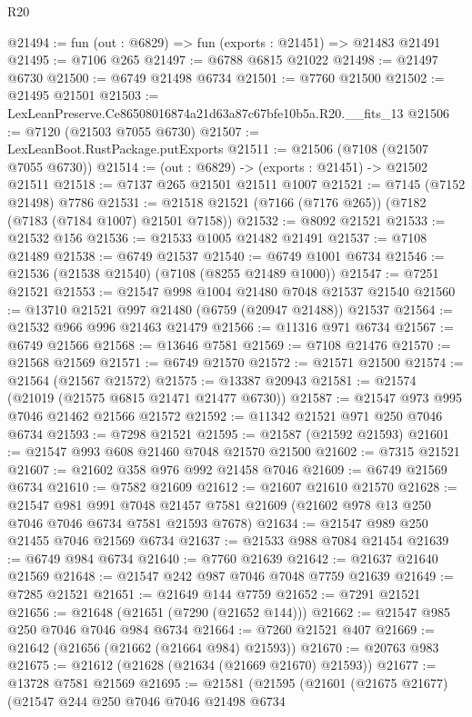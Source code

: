 \begin{lexlean}{R20}
\begin{coremodule}
{@21494 := fun (out : @6829) => fun (exports : @21451) => @21483 @21491
@21495 := @7106 @265
@21497 := @6788 @6815 @21022
@21498 := @21497 @6730
@21500 := @6749 @21498 @6734
@21501 := @7760 @21500
@21502 := @21495 @21501
@21503 := LexLeanPreserve.Ce86508016874a21d63a87c67bfe10b5a.R20.__fits_13
@21506 := @7120 (@21503 @7055 @6730)
@21507 := LexLeanBoot.RustPackage.putExports
@21511 := @21506 (@7108 (@21507 @7055 @6730))
@21514 := (out : @6829) -> (exports : @21451) -> @21502 @21511
@21518 := @7137 @265 @21501 @21511 @1007
@21521 := @7145 (@7152 @21498) @7786
@21531 := @21518 @21521 (@7166 (@7176 @265)) (@7182 (@7183 (@7184 @1007) @21501 @7158))
@21532 := @8092 @21521
@21533 := @21532 @156
@21536 := @21533 @1005 @21482 @21491
@21537 := @7108 @21489
@21538 := @6749 @21537
@21540 := @6749 @1001 @6734
@21546 := @21536 (@21538 @21540) (@7108 (@8255 @21489 @1000))
@21547 := @7251 @21521
@21553 := @21547 @998 @1004 @21480 @7048 @21537 @21540
@21560 := @13710 @21521 @997 @21480 (@6759 (@20947 @21488)) @21537
@21564 := @21532 @966 @996 @21463 @21479
@21566 := @11316 @971 @6734
@21567 := @6749 @21566
@21568 := @13646 @7581
@21569 := @7108 @21476
@21570 := @21568 @21569
@21571 := @6749 @21570
@21572 := @21571 @21500
@21574 := @21564 (@21567 @21572)
@21575 := @13387 @20943
@21581 := @21574 (@21019 (@21575 @6815 @21471 @21477 @6730))
@21587 := @21547 @973 @995 @7046 @21462 @21566 @21572
@21592 := @11342 @21521 @971 @250 @7046 @6734
@21593 := @7298 @21521
@21595 := @21587 (@21592 @21593)
@21601 := @21547 @993 @608 @21460 @7048 @21570 @21500
@21602 := @7315 @21521
@21607 := @21602 @358 @976 @992 @21458 @7046
@21609 := @6749 @21569 @6734
@21610 := @7582 @21609
@21612 := @21607 @21610 @21570
@21628 := @21547
    @981
    @991
    @7048
    @21457
    @7581
    @21609
    (@21602 @978 @13 @250 @7046 @7046 @6734 @7581 @21593 @7678)
@21634 := @21547 @989 @250 @21455 @7046 @21569 @6734
@21637 := @21533 @988 @7084 @21454
@21639 := @6749 @984 @6734
@21640 := @7760 @21639
@21642 := @21637 @21640 @21569
@21648 := @21547 @242 @987 @7046 @7048 @7759 @21639
@21649 := @7285 @21521
@21651 := @21649 @144 @7759
@21652 := @7291 @21521
@21656 := @21648 (@21651 (@7290 (@21652 @144)))
@21662 := @21547 @985 @250 @7046 @7046 @984 @6734
@21664 := @7260 @21521 @407
@21669 := @21642 (@21656 (@21662 (@21664 @984) @21593))
@21670 := @20763 @983
@21675 := @21612 (@21628 (@21634 (@21669 @21670) @21593))
@21677 := @13728 @7581 @21569
@21695 := @21581
    (@21595
      (@21601
        (@21675 @21677)
        (@21547
          @244
          @250
          @7046
          @7046
          @21498
          @6734
}
\end{coremodule}
\end{lexlean}
